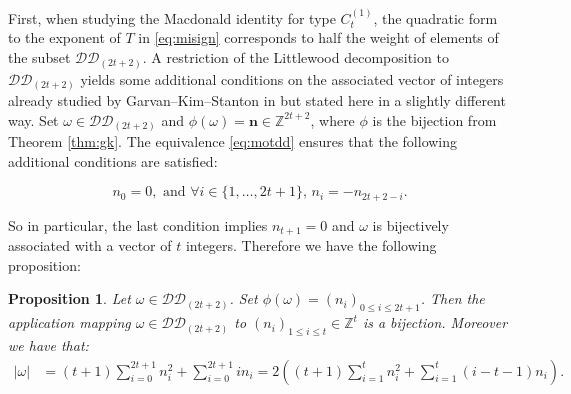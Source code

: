 \documentclass[11pt,letterpaper]{amsart}
\def\bbbz{\mathbb Z}
\def\ccdd{\mathcal {DD}}
\def\ccp{\mathcal P}
\newtheorem{prop}[df]{Proposition}		%
\newtheorem{thm}[df]{Theorem}
\numberwithin{equation}{section}
\numberwithin{df}{section}
\begin{document}


First, when studying the Macdonald identity for type $C^{(1)}_{t}$, the quadratic form to the exponent of $T$ in \eqref{eq:misign} corresponds to half the weight of elements of the subset $\ccdd_{(2t+2)}$.
A restriction of the Littlewood decomposition to $\ccdd_{(2t+2)}$ yields some additional conditions on the associated vector of integers already studied by Garvan--Kim--Stanton in \cite{GKS} but stated here in a slightly different way. Set $\omega\in \ccdd_{(2t+2)}$ and $\phi(\omega)=\mathbf{n}\in\bbbz^{2t+2}$, where $\phi$ is the bijection from Theorem \ref{thm:gk}. The equivalence \eqref{eq:motdd} ensures that the following additional conditions are satisfied:

\begin{equation}\label{eq:ndd2tplus2}
n_0=0, \text{ and }\forall i \in \lbrace 1,\dots,2t+1\rbrace,\, n_i=-n_{2t+2-i}.
\end{equation}

\noindent So in particular, the last condition implies $n_{t+1}=0$ and $\omega$ is bijectively associated with a vector of $t$ integers. Therefore we have the following proposition:

\begin{prop}\label{prop:dd2t+2}\cite[Bijection $4$]{GKS}
Let $\omega\in \ccdd_{(2t+2)}$. Set $\phi(\omega)=(n_i)_{0\leq i\leq 2t+1}$. Then the application mapping $\omega\in\ccdd_{(2t+2)}$ to $(n_i)_{1\leq i\leq t}\in\mathbb{Z}^t$ is a bijection. Moreover we have that:
\begin{align}
\lvert \omega \rvert &=(t+1)\sum_{i=0}^{2t+1}n_i^2+\sum_{i=0}^{2t+1}in_i=2\left((t+1)\sum_{i=1}^{t}n_i^2+\sum_{i=1}^{t}(i-t-1)n_i\right).\label{eq:gkddpair}
\end{align}

\end{prop}
\end{document}
